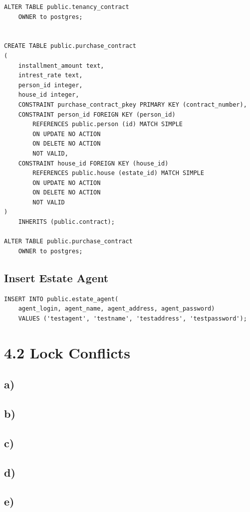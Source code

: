 \documentclass[ngerman]{dis-template-add}
\begin{document}
\begin{verbatim}
ALTER TABLE public.tenancy_contract
    OWNER to postgres;


CREATE TABLE public.purchase_contract
(
    installment_amount text,
    intrest_rate text,
    person_id integer,
    house_id integer,
    CONSTRAINT purchase_contract_pkey PRIMARY KEY (contract_number),
    CONSTRAINT person_id FOREIGN KEY (person_id)
        REFERENCES public.person (id) MATCH SIMPLE
        ON UPDATE NO ACTION
        ON DELETE NO ACTION
        NOT VALID,
    CONSTRAINT house_id FOREIGN KEY (house_id)
        REFERENCES public.house (estate_id) MATCH SIMPLE
        ON UPDATE NO ACTION
        ON DELETE NO ACTION
        NOT VALID
)
    INHERITS (public.contract);

ALTER TABLE public.purchase_contract
    OWNER to postgres;
\end{verbatim}


\subsection*{Insert Estate Agent}

\begin{verbatim}
INSERT INTO public.estate_agent(
    agent_login, agent_name, agent_address, agent_password)
    VALUES ('testagent', 'testname', 'testaddress', 'testpassword');
\end{verbatim}



\section*{4.2 Lock Conflicts}

\subsection*{a)}

\subsection*{b)}

\subsection*{c)}

\subsection*{d)}

\subsection*{e)}
\end{document}

